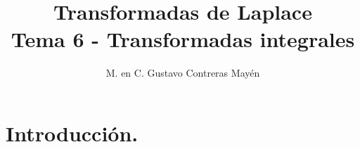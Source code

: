 
\title{Transformadas de Laplace \\ \large {Tema 6 - Transformadas integrales} \vspace{-3ex}}
\author{M. en C. Gustavo Contreras Mayén}
\date{ }

\vspace{-4cm}
\maketitle
\fontsize{14}{14}\selectfont
\tableofcontents
\newpage

\section{Introducción.}

